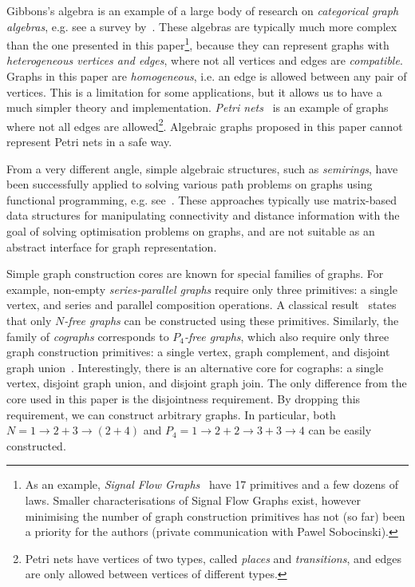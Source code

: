 Gibbons's algebra is an example of a large body of research on \emph{categorical
graph algebras}, e.g. see a survey by~\citet{2010_selinger_survey}. These algebras
are typically much more complex than the one presented in this paper\footnote{As an
example, \emph{Signal Flow Graphs}~\cite{2015_bonchi_sfg} have 17 primitives
and a few dozens of laws. Smaller characterisations of Signal Flow Graphs exist,
however minimising the number of graph construction primitives has not (so far) been
a priority for the authors (private communication with Pawel Sobocinski).},
because they can represent graphs with
\emph{heterogeneous vertices and edges}, where not all vertices
and edges are \emph{compatible}. Graphs in this paper are \emph{homogeneous}, i.e.
an edge is allowed between any pair of vertices. This is a limitation for some
applications, but it allows us to have a much simpler theory and implementation.
\emph{Petri nets}~\cite{1989_murata_pn} is an example of graphs where not all
edges are allowed\footnote{Petri nets have vertices of two types, called \emph{places}
and \emph{transitions}, and edges are only allowed between vertices of different
types.}.
Algebraic graphs proposed in this paper cannot represent Petri
nets in a safe way.

From a very different angle, simple algebraic structures, such as \emph{semirings},
have been successfully applied to solving various path problems on graphs using
functional programming, e.g. see~\citet{2013_semirings_dolan}. These approaches
typically use matrix-based data structures for manipulating connectivity and distance
information with the goal of solving optimisation problems on graphs, and are not
suitable as an abstract interface for graph representation.

Simple graph construction cores are known for special families of graphs. For example,
non-empty \emph{series-parallel graphs} require only three primitives: a single vertex,
and series and parallel composition operations. A classical result~\cite{1979_valdes_sp}
states that only \emph{$N$-free graphs} can be constructed using these primitives.
Similarly, the family of \emph{cographs} corresponds to \emph{$P_4$-free graphs}, which
also require only three graph construction primitives: a single vertex, graph complement,
and disjoint graph union~\cite{1981_corneil_cographs}. Interestingly, there is an
alternative core for cographs: a single vertex, disjoint graph union, and disjoint graph
join. The only difference from the core used in this paper is the disjointness requirement.
By dropping this requirement, we can construct arbitrary graphs. In particular, both
$N = 1 \rightarrow 2 + 3 \rightarrow (2 + 4)$ and
$P_4 = 1 \rightarrow 2 + 2 \rightarrow 3 + 3 \rightarrow 4$ can be easily constructed.

